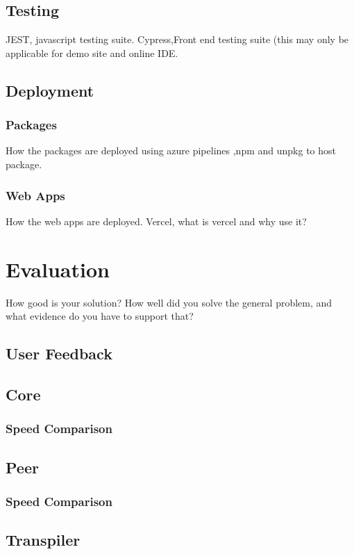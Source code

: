 \documentclass{l4proj}
\begin{document}
\section{Testing}
\text JEST, javascript testing suite. Cypress,Front end testing suite (this may only be applicable for demo site and online IDE.


\section{Deployment}
\subsection{Packages}
\text How the packages are deployed using azure pipelines ,npm and unpkg to host package.
\subsection{Web Apps}
\text How the web apps are deployed. Vercel, what is vercel and why use it?



\chapter{Evaluation} 
How good is your solution? How well did you solve the general problem, and what evidence do you have to support that?

\section{User Feedback}
\section{Core}
\subsection{Speed Comparison}
\section{Peer}
\subsection{Speed Comparison}
\section{Transpiler}
\end{document}
